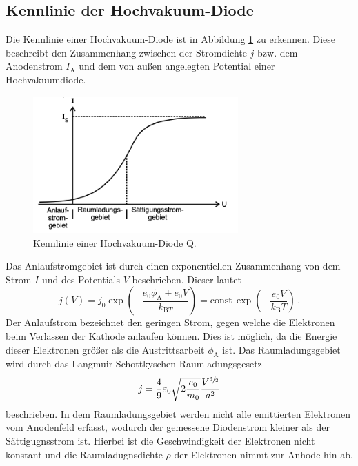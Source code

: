 \subsection{Kennlinie der Hochvakuum-Diode}
Die Kennlinie einer Hochvakuum-Diode ist in Abbildung \ref{fig:Kennlinie} zu erkennen. Diese beschreibt den Zusammenhang zwischen der Stromdichte 
$j$ bzw. dem Anodenstrom $I_{\text{A}}$ und dem von außen angelegten Potential einer Hochvakuumdiode.
\begin{figure}[H]
  \centering
  \includegraphics[width=0.7\textwidth]{content/Bilder/Kennlinie.png}
  \caption{Kennlinie einer Hochvakuum-Diode Q\cite{anleitungV504}.}
  \label{fig:Kennlinie}
\end{figure}
Das Anlaufstromgebiet ist durch einen exponentiellen Zusammenhang von dem Strom $I$ und des Potentials $V$ beschrieben. Dieser lautet
\begin{equation}
    j(V)=j_0 \exp \left( -\frac{e_0 \phi_{\text{A}}+e_0V}{k_{\text{B}T}}\right) = \text{const}\,\exp \left(-\frac{e_0V}{k_{\text{B}}T}\right)\,.
    \label{eqn:Anlaufstrom}
\end{equation}
Der Anlaufstrom bezeichnet den geringen Strom, gegen welche die Elektronen beim Verlassen der Kathode anlaufen können. Dies ist möglich, da die Energie dieser Elektronen
größer als die Austrittsarbeit $\phi_{\text{A}}$ ist. Das Raumladungsgebiet wird durch das Langmuir-Schottkyschen-Raumladungsgesetz 
\begin{equation}
    j = \frac{4}{9}\varepsilon_0 \sqrt{2 \frac{e_0}{m_0}}\frac{V^{\sfrac{3}{2}}}{a^2}
    \label{eqn:Raumladungsgesetz}
\end{equation}
beschrieben. In dem Raumladungsgebiet werden nicht alle emittierten Elektronen vom Anodenfeld erfasst, wodurch der gemessene Diodenstrom kleiner als der Sättigugnsstrom ist. 
Hierbei ist die Geschwindigkeit der Elektronen nicht konstant und die Raumladugnsdichte $\rho$ der Elektronen nimmt zur Anhode hin ab. 
